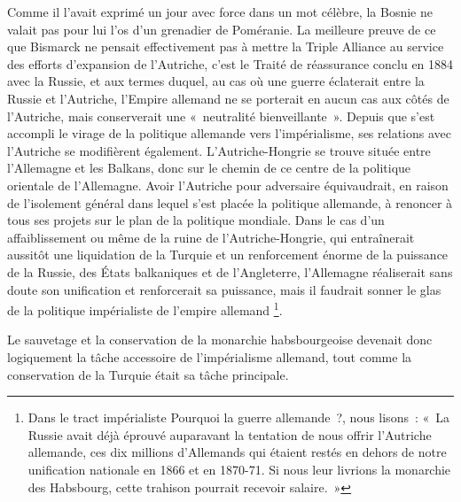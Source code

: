 \documentclass[french,twoside]{book} %
\begin{document}
\noindent Comme il l’avait exprimé un jour avec force dans un mot célèbre, la Bosnie ne valait pas pour lui l’os d’un grenadier de Poméranie. La meilleure preuve de ce que Bismarck ne pensait effectivement pas à mettre la Triple Alliance au service des efforts d’expansion de l’Autriche, c’est le Traité de réassurance conclu en 1884 avec la Russie, et aux termes duquel, au cas où une guerre éclaterait entre la Russie et l’Autriche, l’Empire allemand ne se porterait en aucun cas aux côtés de l’Autriche, mais conserverait une « neutralité bienveillante ». Depuis que s’est accompli le virage de la politique allemande vers l’impérialisme, ses relations avec l’Autriche se modifièrent également. L'Autriche-Hongrie se trouve située entre l’Allemagne et les Balkans, donc sur le chemin de ce centre de la politique orientale de l’Allemagne. Avoir l’Autriche pour adversaire équivaudrait, en raison de l’isolement général dans lequel s’est placée la politique allemande, à renoncer à tous ses projets sur le plan de la politique mondiale. Dans le cas d’un affaiblissement ou même de la ruine de l’Autriche-Hongrie, qui entraînerait aussitôt une liquidation de la Turquie et un renforcement énorme de la puissance de la Russie, des États balkaniques et de l’Angleterre, l’Allemagne réaliserait sans doute son unification et renforcerait sa puissance, mais il faudrait sonner le glas de la politique impérialiste de l’empire allemand \footnote{Dans le tract impérialiste Pourquoi la guerre allemande ?, nous lisons : « La Russie avait déjà éprouvé auparavant la tentation de nous offrir l’Autriche allemande, ces dix millions d’Allemands qui étaient restés en dehors de notre unification nationale en 1866 et en 1870-71. Si nous leur livrions la monarchie des Habsbourg, cette trahison pourrait recevoir salaire. »}.\par
Le sauvetage et la conservation de la monarchie habsbourgeoise devenait donc logiquement la tâche accessoire de l’impérialisme allemand, tout comme la conservation de la Turquie était sa tâche principale.\par
\end{document}
